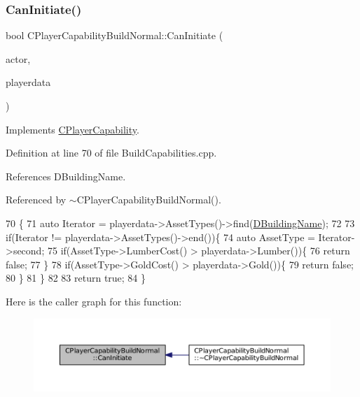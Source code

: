 \subsubsection{\texorpdfstring{Can\+Initiate()}{CanInitiate()}}
{\footnotesize\ttfamily bool C\+Player\+Capability\+Build\+Normal\+::\+Can\+Initiate (\begin{DoxyParamCaption}\item[{std\+::shared\+\_\+ptr$<$ \hyperlink{classCPlayerAsset}{C\+Player\+Asset} $>$}]{actor,  }\item[{std\+::shared\+\_\+ptr$<$ \hyperlink{classCPlayerData}{C\+Player\+Data} $>$}]{playerdata }\end{DoxyParamCaption})\hspace{0.3cm}{\ttfamily [virtual]}}



Implements \hyperlink{classCPlayerCapability_aa83b1e1fcaff2985c378132d679154ea}{C\+Player\+Capability}.



Definition at line 70 of file Build\+Capabilities.\+cpp.



References D\+Building\+Name.



Referenced by $\sim$\+C\+Player\+Capability\+Build\+Normal().


\begin{DoxyCode}
70                                                                                                            
                     \{
71     \textcolor{keyword}{auto} Iterator = playerdata->AssetTypes()->find(\hyperlink{classCPlayerCapabilityBuildNormal_aae09d6cee5f8e201a0139c9065a5577c}{DBuildingName});
72     
73     \textcolor{keywordflow}{if}(Iterator != playerdata->AssetTypes()->end())\{
74         \textcolor{keyword}{auto} AssetType = Iterator->second;
75         \textcolor{keywordflow}{if}(AssetType->LumberCost() > playerdata->Lumber())\{
76             \textcolor{keywordflow}{return} \textcolor{keyword}{false};   
77         \}
78         \textcolor{keywordflow}{if}(AssetType->GoldCost() > playerdata->Gold())\{
79             \textcolor{keywordflow}{return} \textcolor{keyword}{false};   
80         \}
81     \}
82     
83     \textcolor{keywordflow}{return} \textcolor{keyword}{true};
84 \}
\end{DoxyCode}
Here is the caller graph for this function\+:\nopagebreak
\begin{figure}[H]
\begin{center}
\leavevmode
\includegraphics[width=350pt]{classCPlayerCapabilityBuildNormal_a5487e5521779846198604e8ebadaf283_icgraph}
\end{center}
\end{figure}


